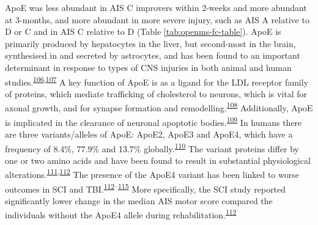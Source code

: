 \documentclass[
]{article}
\begin{document}
ApoE was less abundant in AIS C improvers within 2-weeks and more abundant at 3-months, and more abundant in more severe injury, such as AIS A relative to D or C and in AIS C relative to D (Table \ref{tab:openms-fc-table}).
ApoE is primarily produced by hepatocytes in the liver, but second-most in the brain, synthesised in and secreted by astrocytes, and has been found to an important determinant in response to types of CNS injuries in both animal and human studies.\textsuperscript{\protect\hyperlink{ref-teasdale_association_1997}{106},\protect\hyperlink{ref-poirier_apolipoprotein_1994}{107}}
A key function of ApoE is as a ligand for the LDL receptor family of proteins, which mediate trafficking of cholesterol to neurons, which is vital for axonal growth, and for synapse formation and remodelling.\textsuperscript{\protect\hyperlink{ref-xu_interactions_2014}{108}}
Additionally, ApoE is implicated in the clearance of neuronal apoptotic bodies.\textsuperscript{\protect\hyperlink{ref-elliott_apoptosis_2007}{109}}
In humans there are three variants/alleles of ApoE: ApoE2, ApoE3 and ApoE4, which have a frequency of 8.4\%, 77.9\% and 13.7\% globally.\textsuperscript{\protect\hyperlink{ref-liu_apolipoprotein_2013}{110}}
The variant proteins differ by one or two amino acids and have been found to result in substantial physiological alterations.\textsuperscript{\protect\hyperlink{ref-mahley_apolipoprotein_2000}{111},\protect\hyperlink{ref-jha_apolipoprotein_2008}{112}}
The presence of the ApoE4 variant has been linked to worse outcomes in SCI and TBI.\textsuperscript{\protect\hyperlink{ref-jha_apolipoprotein_2008}{112}--\protect\hyperlink{ref-friedman_apolipoprotein_1999}{115}}
More specifically, the SCI study reported significantly lower change in the median AIS motor score compared the individuals without the ApoE4 allele during rehabilitation.\textsuperscript{\protect\hyperlink{ref-jha_apolipoprotein_2008}{112}}
\end{document}
